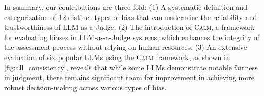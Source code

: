 \documentclass{article} %
\newcommand{\header}[1]{\noindent\textbf{{#1}}~~}
\begin{document}
In summary, our contributions are three-fold: (1) A systematic definition and categorization of 12 distinct types of bias that can undermine the reliability and trustworthiness of LLM-as-a-Judge. (2) The introduction of \textsc{Calm}, a framework for evaluating biases in LLM-as-a-Judge systems, which enhances the integrity of the assessment process without relying on human resources. (3) An extensive evaluation of six popular LLMs using the \textsc{Calm} framework, as shown in \autoref{fig:all_consistency}, reveals that while some LLMs demonstrate notable fairness in judgment, there remains significant room for improvement in achieving more robust decision-making across various types of bias.





\end{document}
